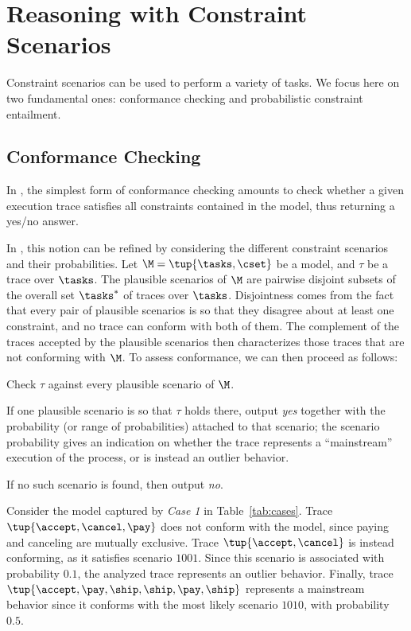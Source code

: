 \section{Reasoning with Constraint Scenarios}
Constraint scenarios can be used to perform a variety of tasks. We focus here on two fundamental ones: conformance checking and probabilistic constraint entailment.

\subsection{Conformance Checking}
In \declare, the simplest form of conformance checking amounts to check whether a given execution trace satisfies all constraints contained in the model, thus returning a yes/no answer.

In \pdeclare, this notion can be refined by considering the different constraint scenarios and their probabilities. Let $\M = \tup{\tasks,\cset}$ be a \pdeclare model, and $\tau$ be a trace over $\tasks$. The plausible scenarios of $\M$ are pairwise disjoint subsets of the overall set $\tasks^*$ of traces over $\tasks$. Disjointness comes from the fact that every pair of plausible scenarios is so that they disagree about at least one constraint, and no trace can conform with both of them. The complement of the traces accepted by the plausible scenarios then characterizes those traces that are not conforming with $\M$. To assess conformance, we can then proceed as follows:
\begin{inparaenum}[(1)]
\item Check $\tau$ against every plausible scenario of $\M$.
\item If one plausible scenario is so that $\tau$ holds there, output \emph{yes} together with the probability (or range of probabilities) attached to that scenario; the scenario probability gives an indication on whether the trace represents a ``mainstream'' execution of the process, or is instead an outlier behavior.
\item If no such scenario is found, then output \emph{no}.
\end{inparaenum}

\begin{example}
  Consider the \pdeclare model captured by \emph{Case 1} in Table~\ref{tab:cases}. Trace $\tup{\accept,\cancel,\pay}$ does not conform with the model, since paying and canceling are mutually exclusive. Trace $\tup{\accept,\cancel}$ is instead conforming, as it satisfies scenario $1001$. Since this scenario is associated with probability $0.1$, the analyzed trace represents an outlier behavior. Finally, trace $\tup{\accept, \pay, \ship, \ship, \pay, \ship}$ represents a mainstream behavior since it conforms with the most likely scenario $1010$, with probability $0.5$.
\end{example}

